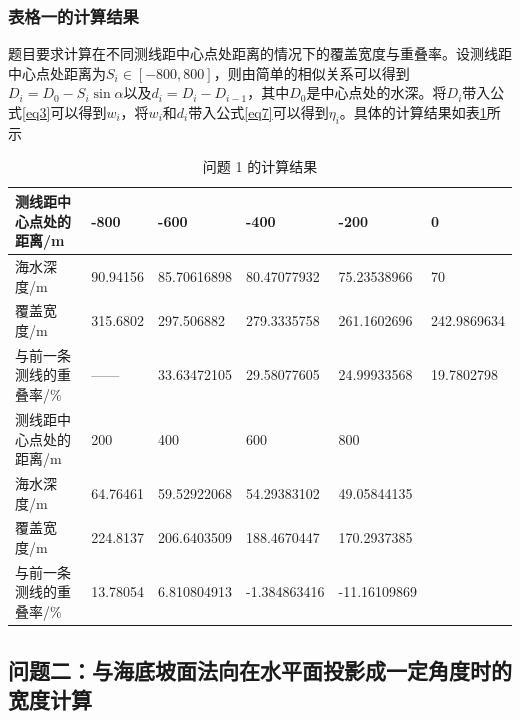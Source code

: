 \documentclass{article}
\begin{document}
\subsubsection{表格一的计算结果}
	\par 题目要求计算在不同测线距中心点处距离的情况下的覆盖宽度与重叠率。设测线距中心点处距离为$S_i\in[-800,800]$，则由简单的相似关系可以得到$D_i=D_0 - S_i\sin\alpha$以及$d_i = D_i-D_{i-1}$，其中$D_0$是中心点处的水深。将$D_i$带入公式\eqref{eq3}可以得到$w_i$，将$w_i$和$d_i$带入公式\eqref{eq7}可以得到$\eta_{i}$。具体的计算结果如表\ref{ansSheet1}所示

\begin{table}[H]
	\caption{问题 1 的计算结果}\label{ansSheet1}
	\begin{tabular}{llllll}
		\hline
		测线距中心点处的距离/m  & -800     & -600        & -400         & -200         &  0\\ \hline
		海水深度/m        & 90.94156 & 85.70616898 & 80.47077932  & 75.23538966  & 70                     \\
		覆盖宽度/m        & 315.6802 & 297.506882  & 279.3335758  & 261.1602696  & 242.9869634            \\
		与前一条测线的重叠率/\% & ——       & 33.63472105 & 29.58077605  & 24.99933568  & 19.7802798             \\ \hline
		测线距中心点处的距离/m  & 200      & 400         & 600          & 800          &                        \\ \hline
		海水深度/m        & 64.76461 & 59.52922068 & 54.29383102  & 49.05844135  &                        \\
		覆盖宽度/m        & 224.8137 & 206.6403509 & 188.4670447  & 170.2937385  &                        \\
		与前一条测线的重叠率/\% & 13.78054 & 6.810804913 & -1.384863416 & -11.16109869 &                        \\ \hline
	\end{tabular}
\end{table}



\subsection{问题二：与海底坡面法向在水平面投影成一定角度时的宽度计算}
\end{document}
